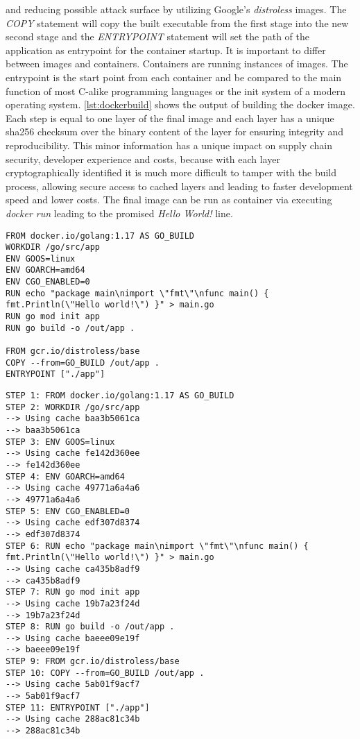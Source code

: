 \documentclass[titlepage]{report}
\begin{document}
and reducing possible attack surface by utilizing Google's \emph{distroless} images. The \emph{COPY} statement will
copy the built executable from the first stage into the new second stage and the \emph{ENTRYPOINT} statement will set
the path of the application as entrypoint for the container startup. It is important to differ between images and containers.
Containers are running instances of images. The entrypoint is the start point from each container and be compared to the main function
of most C-alike programming languages or the init system of a modern operating system. \autoref{lst:dockerbuild} shows
the output of building the docker image. Each step is equal to one layer of the final image and each layer has a unique
\gls{sha256} checksum over the binary content of the layer for ensuring integrity and reproducibility. This minor information
has a unique impact on supply chain security, developer experience and costs, because with each layer cryptographically
identified it is much more difficult to tamper with the build process, allowing secure access to cached layers
and leading to faster development speed and lower costs. The final image can be run as container via executing
\emph{docker run} leading to the promised \emph{Hello World!} line. 
\begin{minipage}{\linewidth}
\begin{lstlisting}[caption={A multi stage Dockerfile with different layers},label={lst:dockerfile}]
FROM docker.io/golang:1.17 AS GO_BUILD
WORKDIR /go/src/app
ENV GOOS=linux
ENV GOARCH=amd64
ENV CGO_ENABLED=0
RUN echo "package main\nimport \"fmt\"\nfunc main() { fmt.Println(\"Hello world!\") }" > main.go
RUN go mod init app
RUN go build -o /out/app .

FROM gcr.io/distroless/base
COPY --from=GO_BUILD /out/app .
ENTRYPOINT ["./app"]
\end{lstlisting}
\end{minipage}
\begin{minipage}{\linewidth}
\begin{lstlisting}[caption={Output of a docker build run with shortened SHA256 checksums},label={lst:dockerbuild}]
STEP 1: FROM docker.io/golang:1.17 AS GO_BUILD
STEP 2: WORKDIR /go/src/app
--> Using cache baa3b5061ca
--> baa3b5061ca
STEP 3: ENV GOOS=linux
--> Using cache fe142d360ee
--> fe142d360ee
STEP 4: ENV GOARCH=amd64
--> Using cache 49771a6a4a6
--> 49771a6a4a6
STEP 5: ENV CGO_ENABLED=0
--> Using cache edf307d8374
--> edf307d8374
STEP 6: RUN echo "package main\nimport \"fmt\"\nfunc main() { fmt.Println(\"Hello world!\") }" > main.go
--> Using cache ca435b8adf9
--> ca435b8adf9
STEP 7: RUN go mod init app
--> Using cache 19b7a23f24d
--> 19b7a23f24d
STEP 8: RUN go build -o /out/app .
--> Using cache baeee09e19f
--> baeee09e19f
STEP 9: FROM gcr.io/distroless/base
STEP 10: COPY --from=GO_BUILD /out/app .
--> Using cache 5ab01f9acf7
--> 5ab01f9acf7
STEP 11: ENTRYPOINT ["./app"]
--> Using cache 288ac81c34b
--> 288ac81c34b
\end{lstlisting}
\end{minipage}
\end{document}
